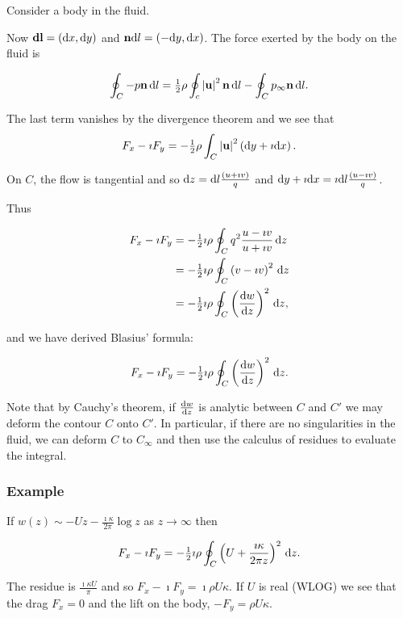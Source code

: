 \documentclass{notes}
\theoremstyle{plain}
\begin{document}
Consider a body in the fluid.

\vspace{1in}

Now $\mathbf{dl} = (\mathrm{d} x, \mathrm{d} y)$ and $\mathbf{n} \mathrm{d} l = (-\mathrm{d} y, \mathrm{d} x)$.  The
force exerted by the body on the fluid is

\[
\oint_C -p \mathbf{n}\, \mathrm{d} l = \tfrac{1}{2} \rho \oint_c \left|\mathbf{u}\right|^2 \mathbf{n}\, \mathrm{d} l
- \oint_C p_\infty \mathbf{n}\, \mathrm{d} l.
\]

The last term vanishes by the divergence theorem and we see that
\[
F_x - \imath F_y = -\tfrac{1}{2} \rho \int_C \left|\mathbf{u}\right|^2 \left( \mathrm{d} y
+ \imath \mathrm{d} x\right).
\]

On $C$, the flow is tangential and so $\mathrm{d} z = \mathrm{d} l
\frac{\left(u + \imath v \right)}{q}$ and
$\mathrm{d} y + \imath \mathrm{d} x = \imath \mathrm{d} l \frac{\left(u - \imath v\right)}{q}$.

Thus

\begin{align*}
F_x - \imath F_y &= - \tfrac{1}{2} \imath \rho
\oint_C q^2 \frac{u - \imath v}{u + \imath v}\, \mathrm{d} z \\
&= -\tfrac{1}{2} \imath \rho \oint_C \left( v - \imath v \right)^2\, \mathrm{d} z \\
&= - \tfrac{1}{2} \imath \rho \oint_C \left( \frac{\mathrm{d} w}{\mathrm{d} z} \right)^2\, \mathrm{d} z,
\end{align*}

and we have derived Blasius' formula:

\begin{equation}\label{eq:blaform}
F_x - \imath F_y = - \tfrac{1}{2} \imath \rho \oint_C \left( \frac{\mathrm{d} w}{\mathrm{d} z}
\right)^2\, \mathrm{d} z.
\end{equation}

Note that by Cauchy's theorem, if $\frac{\mathrm{d} w}{\mathrm{d} z}$ is analytic between
$C$ and $C'$ we may deform the contour $C$ onto $C'$.  In particular,
if there are no singularities in the fluid, we can deform $C$ to $C_\infty$
and then use the calculus of residues to evaluate the integral.

\subsubsection*{Example}

If $w(z) \sim - U z - \frac{\imath \kappa}{2 \pi} \log z$ as $z \to \infty$
then

\[
F_x - \imath F_y = - \tfrac{1}{2} \imath \rho \oint_C  \left(U
+ \frac{\imath \kappa}{2 \pi z}\right)^2\, \mathrm{d} z.
\]

The residue is $\frac{\imath \kappa U}{\pi}$ and so
$F_x - \imath F_y = \imath \rho U \kappa$.  If $U$ is real (WLOG)
we see that the drag $F_x = 0$ and the lift on the body,
$-F_y = \rho U \kappa$.
\end{document}
